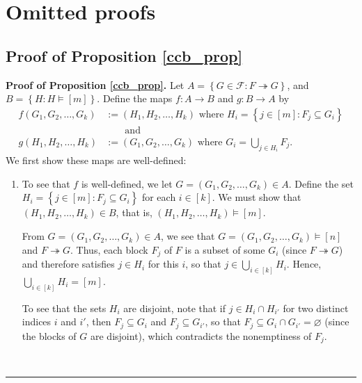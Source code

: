 \documentclass[12pt]{article}
\theoremstyle{definition}%
\theoremstyle{definition}%
\theoremstyle{remark}%
\newcommand{\tup}[1]{\left( #1 \right)}
\newcommand{\interval}[1]{\left[ #1 \right]} %
\newcommand{\set}[1]{\left\{ #1 \right\}}
\newcommand{\CF}{\mathcal{F}}
\newcommand{\con}{\twoheadrightarrow} %
\newenvironment{proof}[1][Proof]{\noindent\textbf{#1.} }{\ \rule{0.5em}{0.5em}}
\begin{document}
\appendix

\section{\label{sec.omitted_proofs}Omitted proofs}

\subsection{\label{subsec.omitted_proofs.ccb_prop}Proof of Proposition \ref{ccb_prop}}

\begin{proof}[Proof of Proposition \ref{ccb_prop}]
    Let $A = \set{G \in \CF : F \con G}$, and $B = \set{H : H \models \interval{m}}$.
	Define the maps $f : A \to B$ and $g : B \to A$ by
    \begin{align*}
    f\tup{G_1, G_2, \ldots, G_k} &:= \tup{H_1, H_2, \ldots, H_k} \text{ where } H_{i} = \set{j \in \interval{m} : F_{j} \subseteq G_{i}}\\
    &\qquad\text{and }\\
    g\tup{H_1, H_2, \ldots, H_k} &:= \tup{G_1, G_2, \ldots, G_k} \text{ where } G_{i} = \bigcup\limits_{j \in H_{i}} F_{j}.
    \end{align*}
    We first show these maps are well-defined:
	
	\begin{enumerate}
	\item To see that $f$ is well-defined, we let $G = \tup{G_1, G_2, \ldots, G_k} \in A$. Define the set $H_{i} = \set{j \in \interval{m} : F_{j} \subseteq G_{i}}$ for each $i \in \interval{k}$.
	We must show that $\tup{H_1, H_2, \ldots, H_k} \in B$, that is, $\tup{H_1, H_2, \ldots, H_k} \models \interval{m}$.
	
	From $G = \tup{G_1, G_2, \ldots, G_k} \in A$, we see that
	$G = \tup{G_1, G_2, \ldots, G_k} \models \interval{n}$
	and $F \con G$.
	Thus, each block $F_{j}$ of $F$ is a subset of some $G_{i}$ (since $F \con G$) and therefore satisfies $j \in H_{i}$ for this $i$, so that $j \in \bigcup_{i \in \interval{k}} H_i$.
	Hence, $\bigcup_{i \in \interval{k}} H_i = \interval{m}$.
	
	To see that the sets $H_{i}$ are disjoint, note that if $j \in H_{i} \cap H_{i'}$ for two distinct indices $i$ and $i'$, then $F_{j} \subseteq G_{i}$ and $F_{j} \subseteq G_{i'}$, so that $F_{j} \subseteq G_{i} \cap G_{i'} = \varnothing$ (since the blocks of $G$ are disjoint), which contradicts the nonemptiness of $F_j$.
	

\end{enumerate}
\end{proof}
\end{document}
